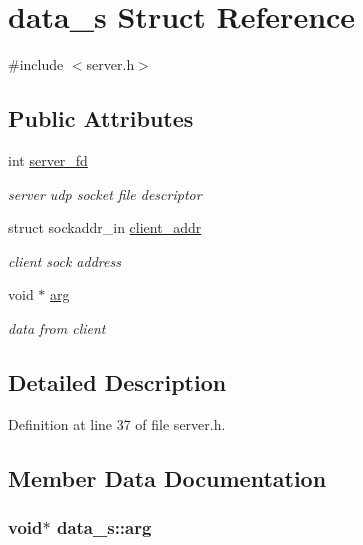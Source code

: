 \hypertarget{structdata__s}{\section{data\-\_\-s Struct Reference}
\label{structdata__s}
}


{\ttfamily \#include $<$server.\-h$>$}

\subsection*{Public Attributes}
\begin{DoxyCompactItemize}
\item 
int \hyperlink{structdata__s_a78aaeb875fb9670cbeb1269fee39dd40}{server\-\_\-fd}
\begin{DoxyCompactList}\small\item\em server udp socket file descriptor \end{DoxyCompactList}\item 
struct sockaddr\-\_\-in \hyperlink{structdata__s_a51ad65b735ac28716f75a66677dec9bb}{client\-\_\-addr}
\begin{DoxyCompactList}\small\item\em client sock address \end{DoxyCompactList}\item 
void $\ast$ \hyperlink{structdata__s_a6c608061e789454befad6d618b4ef8f6}{arg}
\begin{DoxyCompactList}\small\item\em data from client \end{DoxyCompactList}\end{DoxyCompactItemize}


\subsection{Detailed Description}


Definition at line 37 of file server.\-h.



\subsection{Member Data Documentation}
\hypertarget{structdata__s_a6c608061e789454befad6d618b4ef8f6}{
\subsubsection[{arg}]{\setlength{\rightskip}{0pt plus 5cm}void$\ast$ data\-\_\-s\-::arg}}\label{structdata__s_a6c608061e789454befad6d618b4ef8f6}


